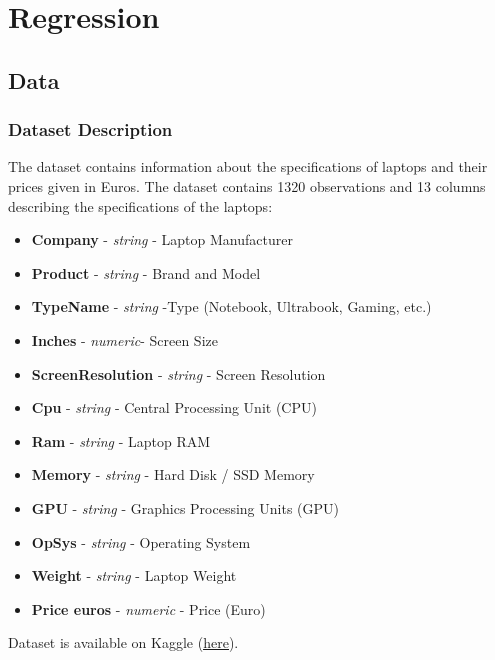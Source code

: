 \documentclass[8pt]{beamer}
\begin{document}
\section{Regression}

\subsection{Data}
\begin{frame}
\frametitle{Dataset Description}
The dataset contains information about the specifications of laptops and their prices given in Euros. The dataset contains 1320 observations and 13 columns describing the specifications of the laptops:
\begin{itemize}
    \item<1-> \textbf{Company} - \textit{string} - Laptop Manufacturer
    \item<1-> \textbf{Product} - \textit{string} - Brand and Model
    \item<1-> \textbf{TypeName} - \textit{string} -Type (Notebook, Ultrabook, Gaming, etc.)
    \item<1-> \textbf{Inches} - \textit{numeric}- Screen Size
    \item<1-> \textbf{ScreenResolution} - \textit{string} - Screen Resolution
    \item<1-> \textbf{Cpu} - \textit{string} - Central Processing Unit (CPU)
    \item<1-> \textbf{Ram} - \textit{string} - Laptop RAM
    \item<1-> \textbf{Memory} - \textit{string} - Hard Disk / SSD Memory
    \item<1-> \textbf{GPU} - \textit{string} - Graphics Processing Units (GPU)
    \item<1-> \textbf{OpSys} - \textit{string} - Operating System
    \item<1-> \textbf{Weight} - \textit{string} - Laptop Weight
    \item<1-> \textbf{Price euros} - \textit{numeric} - Price (Euro)
\end{itemize}
Dataset is available on Kaggle (\href{https://www.kaggle.com/datasets/muhammetvarl/laptop-price}{\underline{here}}).
\end{frame}
\end{document}
